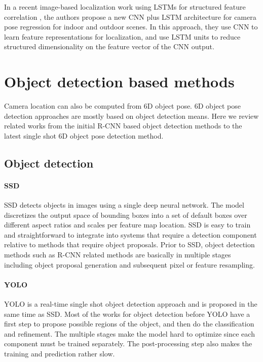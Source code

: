 In a recent image-based localization work using LSTMs for structured feature correlation \cite{walch2017image}, the authors propose a new CNN plus LSTM architecture for camera pose regression for indoor and outdoor scenes. In this approach, they use CNN to learn feature representations for localization, and use LSTM units to reduce structured dimensionality on the feature vector of the CNN output.

\section{Object detection based methods}
Camera location can also be computed from 6D object pose. 6D object pose detection approaches are mostly based on object detection means. Here we review related works from the initial R-CNN based object detection methods to the latest single shot 6D object pose detection method.

\subsection{Object detection}

\paragraph{SSD}
SSD \cite{liu2016ssd} detects objects in images using a single deep neural network. The model discretizes the output space of bounding boxes into a set of default boxes over different aspect ratios and scales per feature map location. SSD is easy to train and straightforward to integrate into systems that require a detection component relative to methods that require object proposals. Prior to SSD, object detection methods such as R-CNN related methods \cite{girshick2014rich, girshick2015fast, ren2015faster} are basically in multiple stages including object proposal generation and subsequent pixel or feature resampling.

\paragraph{YOLO}
YOLO is a real-time single shot object detection approach and is proposed in the same time as SSD. Most of the works for object detection before YOLO have a first step to propose possible regions of the object, and then do the classification and refinement. The multiple stages make the model hard to optimize since each component must be trained separately. The post-processing step also makes the training and prediction rather slow.

